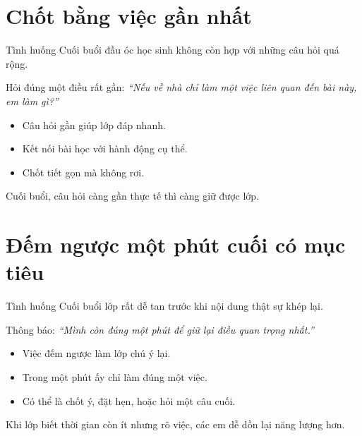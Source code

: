 \section{Chốt bằng việc gần nhất}
\begin{tinhhuong}{Tình huống}
Cuối buổi đầu óc học sinh không còn hợp với những câu hỏi quá rộng.
\end{tinhhuong}
\begin{goiydungngay}
Hỏi đúng một điều rất gần: \textit{``Nếu về nhà chỉ làm một việc liên quan đến bài này, em làm gì?''}
\begin{itemize}
\item Câu hỏi gần giúp lớp đáp nhanh.
\item Kết nối bài học với hành động cụ thể.
\item Chốt tiết gọn mà không rơi.
\end{itemize}
\end{goiydungngay}
\begin{cauchot}
Cuối buổi, câu hỏi càng gần thực tế thì càng giữ được lớp.
\end{cauchot}
\ngancach

\section{Đếm ngược một phút cuối có mục tiêu}
\begin{tinhhuong}{Tình huống}
Cuối buổi lớp rất dễ tan trước khi nội dung thật sự khép lại.
\end{tinhhuong}
\begin{goiydungngay}
Thông báo: \textit{``Mình còn đúng một phút để giữ lại điều quan trọng nhất.''}
\begin{itemize}
\item Việc đếm ngược làm lớp chú ý lại.
\item Trong một phút ấy chỉ làm đúng một việc.
\item Có thể là chốt ý, đặt hẹn, hoặc hỏi một câu cuối.
\end{itemize}
\end{goiydungngay}
\begin{cauchot}
Khi lớp biết thời gian còn ít nhưng rõ việc, các em dễ dồn lại năng lượng hơn.
\end{cauchot}
\ngancach

